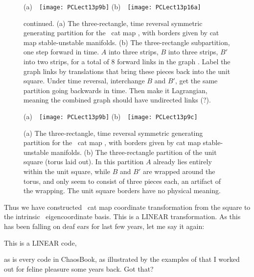 \begin{figure}
  \centering
(a)~~\texttt{[image: PCLect13p9b]}
(b)~~\texttt{[image: PCLect13p16a]}
  \caption{\label{fig:PPCLect13p16a}
 continued.
(a) The three-rectangle, time reversal symmetric generating partition for
the \PV\ cat map , with borders given
by cat map stable-unstable manifolds.
(b) The three-rectangle subpartition, one step forward in time. $A$ into three
strips, $B$ into three strips, $B'$ into two strips, for a total of 8
forward links in the graph
 .
Label the graph links by
translations that bring these pieces back into the unit square.
Under time reversal, interchange $B$ and $B'$, get the same partition going
backwards in time. Then make it Lagrangian, meaning the combined graph should
have undirected links (?).
}
\end{figure}


\begin{figure}
  \centering
(a)~~\texttt{[image: PCLect13p9b]}
(b)~~\texttt{[image: PCLect13p9c]}
  \caption{\label{fig:PCLect13p9b}
(a) The three-rectangle, time reversal symmetric generating partition for
the \PV\ cat map , with borders given
by cat map stable-unstable manifolds.
(b) The three-rectangle partition of the unit square (torus laid out).
In this partition $A$ already lies entirely within the unit square,
while
$B$ and
$B'$ are wrapped around the torus, and only seem to consist of three pieces
each,
an artifact of the wrapping. The unit square borders have no physical meaning.
}
\end{figure}

Thus we have constructed \PV\ cat map coordinate transformation
from the square to the intrinsic \AW\ eigencoordinate basis. This is a
LINEAR transformation. As this has been falling on deaf ears for last few years,
let me say it again:

\bigskip\bigskip

This is a {\Huge LINEAR code},

\bigskip\bigskip

\noindent
as is every code in
Chaos\-Book, as illustrated by the examples of  that
I worked out for feline pleasure some years back. Got that?

